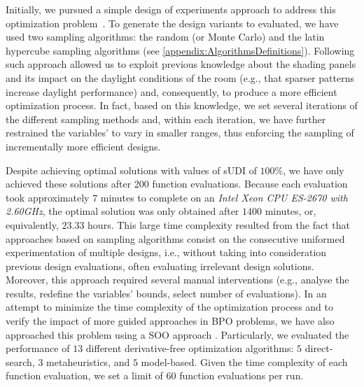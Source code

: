 Initially, we pursued a simple design of experiments approach to address this optimization problem~\cite{Caetano2018}. To generate the design variants to evaluated, we have used two sampling algorithms: the random (or Monte Carlo) and the latin hypercube sampling algorithms (see \cref{appendix:AlgorithmsDefinitions}). Following such approach allowed us to exploit previous knowledge about the shading panels and its impact on the daylight conditions of the room (e.g., that sparser patterns increase daylight performance) and, consequently, to produce a more efficient optimization process. In fact, based on this knowledge, we set several iterations of the different sampling methods and, within each iteration, we have further restrained the variables' to vary in smaller ranges, thus enforcing the sampling of incrementally more efficient designs. %


Despite achieving optimal solutions with values of sUDI of $100\%$, we have only achieved these solutions after 200 function evaluations. Because each evaluation took approximately $7$ minutes to complete on an \textit{Intel Xeon CPU ES-2670 with 2.60GHz}, the optimal solution was only obtained after $1400$ minutes, or, equivalently, $23.33$ hours. This large time complexity resulted from the fact that approaches based on sampling algorithms consist on the consecutive uniformed experimentation of multiple designs, i.e., without taking into consideration previous design evaluations, often evaluating irrelevant design solutions. Moreover, this approach required several manual interventions (e.g., analyse the results, redefine the variables' bounds, select number of evaluations). In an attempt to minimize the time complexity of the optimization process and to verify the impact of more guided approaches in \ac{BPO} problems, we have also approached this problem using a \ac{SOO} approach \cite{Belem2018optimizeddesign}. Particularly, we evaluated the performance of $13$ different derivative-free optimization algorithms: $5$ direct-search, $3$ metaheuristics, and $5$ model-based. Given the time complexity of each function evaluation, we set a limit of $60$ function evaluations per run.


